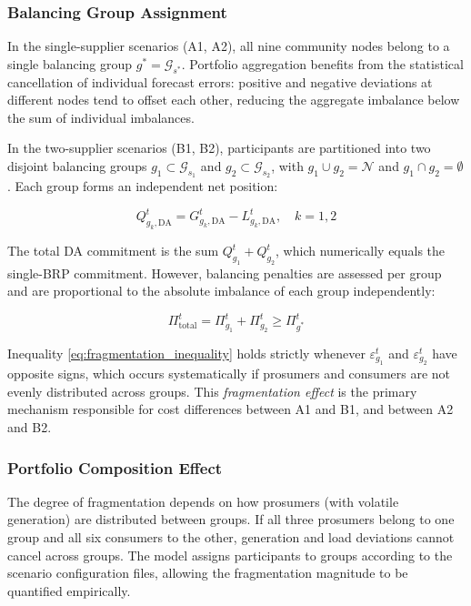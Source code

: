 \documentclass[12pt,a4paper]{article}
\begin{document}
\subsubsection{Balancing Group Assignment}

In the single-supplier scenarios (A1, A2), all nine community nodes belong
to a single balancing group $g^* = \mathcal{G}_{s^*}$.  Portfolio aggregation
benefits from the statistical cancellation of individual forecast errors:
positive and negative deviations at different nodes tend to offset each other,
reducing the aggregate imbalance below the sum of individual imbalances.

In the two-supplier scenarios (B1, B2), participants are partitioned into two
disjoint balancing groups $g_1 \subset \mathcal{G}_{s_1}$ and
$g_2 \subset \mathcal{G}_{s_2}$, with $g_1 \cup g_2 = \mathcal{N}$ and
$g_1 \cap g_2 = \emptyset$.  Each group forms an independent net position:

\begin{equation}
Q_{g_k,\mathrm{DA}}^{t} = G_{g_k,\mathrm{DA}}^{t} - L_{g_k,\mathrm{DA}}^{t},
\quad k = 1, 2
\label{eq:two_bg_net}
\end{equation}

The total DA commitment is the sum $Q_{g_1}^{t} + Q_{g_2}^{t}$, which
numerically equals the single-BRP commitment.  However, balancing penalties
are assessed per group and are proportional to the absolute imbalance of each
group independently:

\begin{equation}
\Pi_{\mathrm{total}}^{t}
  = \Pi_{g_1}^{t} + \Pi_{g_2}^{t}
  \geq \Pi_{g^*}^{t}
\label{eq:fragmentation_inequality}
\end{equation}

Inequality \eqref{eq:fragmentation_inequality} holds strictly whenever
$\varepsilon_{g_1}^{t}$ and $\varepsilon_{g_2}^{t}$ have opposite signs,
which occurs systematically if prosumers and consumers are not evenly
distributed across groups.  This \emph{fragmentation effect} is the primary
mechanism responsible for cost differences between A1 and B1, and between
A2 and B2.

\subsubsection{Portfolio Composition Effect}

The degree of fragmentation depends on how prosumers (with volatile generation)
are distributed between groups.  If all three prosumers belong to one group and
all six consumers to the other, generation and load deviations cannot cancel
across groups.  The model assigns participants to groups according to the
scenario configuration files, allowing the fragmentation magnitude to be
quantified empirically.
\end{document}

